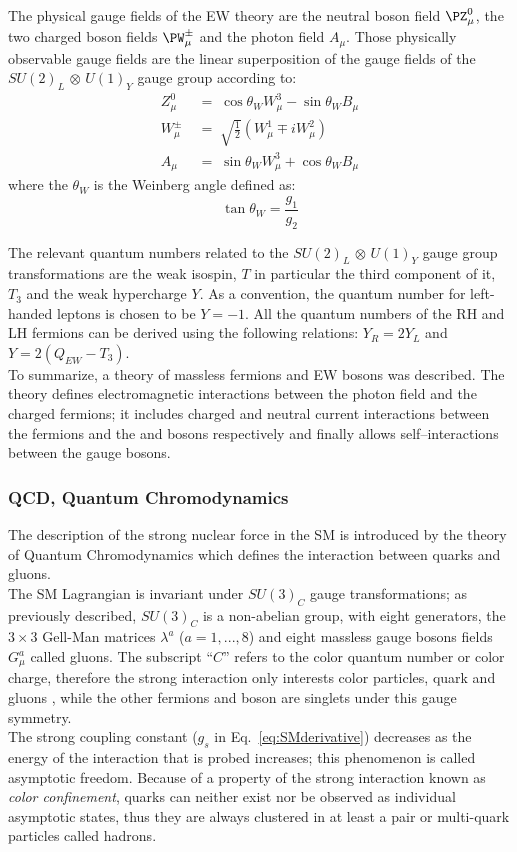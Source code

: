 The physical gauge fields of the EW  theory are the neutral \PZ boson field $\PZ^0_{\mu}$, the two charged \PW boson fields $\PW^{\pm}_{\mu}$ and the photon field $A_{\mu}$. Those physically observable gauge fields are the linear superposition of the gauge fields of the $SU(2)_{L}$ $\otimes$ $U(1)_{Y}$ gauge group according to:
\begin{align}
Z^0_{\mu} \; &= \; \cos\theta_{W} W^3_{\mu} - \sin\theta_{W} B_{\mu} \label{eq:z}\\
W^{\pm}_{\mu} \; &= \; \sqrt{\frac{1}{2}}(W^1_{\mu} \mp iW^2_{\mu}) \label{eq:w}\\
A_{\mu} \; &= \; \sin\theta_{W} W^3_{\mu} + \cos\theta_{W} B_{\mu} \label{eq:photon}
\end{align}
where the $\theta_W$ is the Weinberg angle defined as:
\begin{equation}
\label{eq:weinberg}
\tan \theta_W = \frac{g_1}{g_2}
\end{equation}

The relevant quantum numbers related to the $SU(2)_{L}$ $\otimes$ $U(1)_{Y}$ gauge group transformations are the weak isospin, $T$ in particular the third component of it, $T_3$ and the weak hypercharge $Y$. As a convention, the quantum number for left-handed leptons is chosen to be $Y = -1$. All the quantum numbers of the RH and LH fermions can be derived using the following relations: $Y_R = 2Y_L$ and $Y = 2(Q_{EW}-T_3)$.\\

To summarize, a theory of massless fermions and EW bosons was described. The theory defines electromagnetic interactions between the photon field and the charged fermions; it includes charged and neutral current interactions between the fermions and the \PW and \PZ bosons respectively and finally allows self–interactions between the gauge bosons. 

\subsubsection{QCD, Quantum Chromodynamics}\label{sec:qcd}
The description of the strong nuclear force in the SM is introduced by the theory of Quantum Chromodynamics which defines the interaction between quarks and gluons.\\
The SM Lagrangian is invariant under $SU(3)_C$ gauge transformations; as previously described, $SU(3)_C$ is a non-abelian group, with eight generators, the $3\times3$ Gell-Man matrices $\lambda^a$ ($a = 1,...,8$) and eight massless gauge bosons fields $G^a_{\mu}$ called gluons. The subscript ``$C$'' refers to the color quantum number or color charge, therefore the strong interaction only interests color particles, quark and gluons , while the other fermions and boson are singlets under this gauge symmetry. \\ 
The strong coupling constant ($g_s$ in Eq.~\ref{eq:SMderivative}) decreases as the energy of the interaction that is probed increases; this phenomenon is called asymptotic freedom.
Because of a property of the strong interaction known as \emph{color confinement}, quarks can neither exist nor be observed as individual asymptotic states, thus they are always clustered in at least a pair or multi-quark particles called hadrons.


